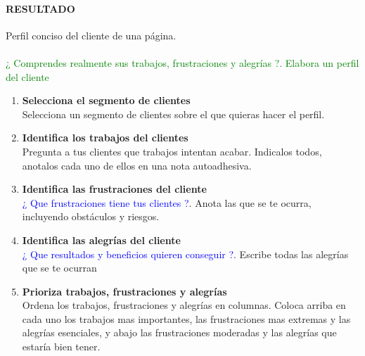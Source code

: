 \documentclass[11pt]{book}
\begin{document}
\paragraph{RESULTADO}
Perfil conciso del cliente de una página.\\\\
\textcolor{green}{¿ Comprendes realmente sus trabajos, frustraciones y alegrías ?. Elabora un perfil del cliente}
\begin{enumerate}
\item \textbf{Selecciona el segmento de clientes}\\
Selecciona un segmento de clientes sobre el que quieras hacer el perfil.
\item \textbf{ Identifica los trabajos del clientes}\\
Pregunta a tus clientes que trabajos intentan acabar. Indicalos todos, anotalos cada uno de ellos en una nota autoadhesiva.
\item \textbf{Identifica las frustraciones del cliente}\\
\textcolor{blue}{¿ Que frustraciones tiene tus clientes ?}. Anota las que se te ocurra, incluyendo obstáculos y riesgos.
\item \textbf{Identifica las alegrías del cliente}\\
\textcolor{blue}{¿ Que resultados y beneficios quieren conseguir ?}. Escribe todas las alegrías que se te ocurran
\item \textbf{Prioriza trabajos, frustraciones y alegrías}\\
Ordena los trabajos, frustraciones y alegrías en columnas. Coloca arriba en cada uno los trabajos mas importantes, las frustraciones mas extremas y las alegrías esenciales, y abajo las frustraciones moderadas y las alegrías que estaría bien tener.
\end{enumerate} 
\end{document}

